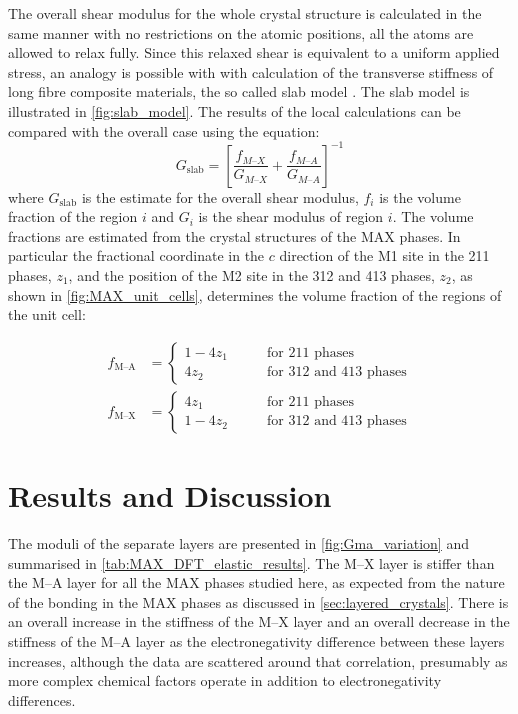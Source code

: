 

The overall shear modulus for the whole crystal structure is calculated in the same manner with no restrictions on the atomic positions, all the atoms are allowed to relax fully. Since this relaxed shear is equivalent to a uniform applied stress, an analogy is possible with with calculation of the transverse stiffness of long fibre composite materials, the so called slab model \cite{Hull1996ch4}. The slab model is illustrated in \autoref{fig:slab_model}. The results of the local calculations can be compared with the overall case using the equation:
\begin{equation}
G_{\text{slab}} = \left[ \frac{f_{M\text{--}X}}{G_{M\text{--}X}} + \frac{f_{M\text{--}A}}{G_{M\text{--}A}} \right]^{-1} \label{eqn:slab_model}
\end{equation}
where $G_{\text{slab}}$ is the estimate for the overall shear modulus, $f_i$ is the volume fraction of the region $i$ and $G_i$ is the shear modulus of region $i$. The volume fractions are estimated from the crystal structures of the MAX phases. In particular the fractional coordinate in the $c$ direction of the M1 site in the 211 phases, $z_1$, and the position of the M2 site in the 312 and 413 phases, $z_2$, as shown in \autoref{fig:MAX_unit_cells}, determines the volume fraction of the regions of the unit cell:

\begin{subequations}
\begin{align}
f_{\text{M--A}} &= 
\begin{cases}
1-4z_1 & \qquad \text{for 211 phases} \\
4z_2 & \qquad \text{for 312 and 413 phases}
\end{cases}  \\[1ex]
f_{\text{M--X}} &= 
\begin{cases}
4z_1 & \qquad \text{for 211 phases} \\
1 - 4z_2 & \qquad \text{for 312 and 413 phases}
\end{cases}
\end{align}
\end{subequations}

\section{Results and Discussion}

The moduli of the separate layers are presented in \autoref{fig:Gma_variation} and summarised in \autoref{tab:MAX_DFT_elastic_results}. The M--X layer is stiffer than the M--A layer for all the MAX phases studied here, as expected from the nature of the bonding in the MAX phases as discussed in \autoref{sec:layered_crystals}. There is an overall increase in the stiffness of the M--X layer and an overall decrease in the stiffness of the M--A layer as the electronegativity difference between these layers increases, although the data are scattered around that correlation, presumably as more complex chemical factors operate in addition to electronegativity differences.


